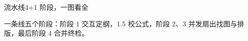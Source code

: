 \begin{frame}{流水线}{4+1 阶段，一图看全}
  \begin{figure}\centering
    \resizebox{0.82\textwidth}{!}{}
  \end{figure}

  \medskip
  \centering
  一条线五个阶段：\alert{阶段 1 交互定纲}，1.5 校公式，\alert{阶段 2、3 并发扇出}找图与排版，最后阶段 4 合并终检。
\end{frame}
